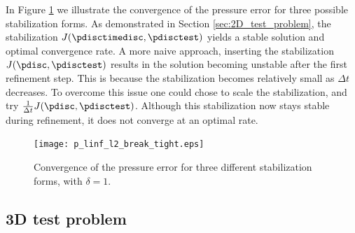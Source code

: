 In Figure \ref{fig:alternative_stabilization} we illustrate the convergence of the pressure error for three possible stabilization forms. As demonstrated in Section \ref{sec:2D_test_problem}, the stabilization $J(\pdisctimedisc,\pdisctest)$ yields a stable solution and optimal convergence rate. A more naive approach, inserting the stabilization $J(\pdisc,\pdisctest)$ results in the solution becoming unstable after the first refinement step. This is because the stabilization becomes relatively small as $\Delta t$ decreases. To overcome this issue one could chose to scale the stabilization, and try  $\frac{1}{\Delta t} J(\pdisc,\pdisctest)$. Although this stabilization now stays stable during refinement, it does not converge at an optimal rate. %

\begin{figure}[h]
\begin{center}
\texttt{[image: p\_linf\_l2\_break\_tight.eps]}
\end{center}
\caption{Convergence of the pressure error for three different stabilization forms, with $\delta=1$. \label{fig:alternative_stabilization}}
\end{figure}


\subsection{3D test problem}
\label{sec:3D_test_problem}

